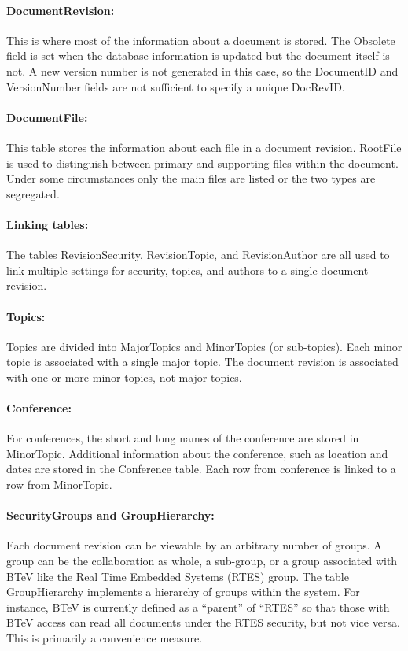 \documentclass[12pt]{article}
\begin{document}
\paragraph{DocumentRevision:} This is where most of the information about a
document is stored. The Obsolete field is set when the database information is
updated but the document itself is not. A new version number is not generated in
this case, so the DocumentID and VersionNumber fields are not sufficient to
specify a unique DocRevID.

\paragraph{DocumentFile:} This table stores  the information about each file in a
document revision. RootFile is used to distinguish between primary and supporting
files within the document. Under some circumstances only the main files are listed
or the two types are segregated.

\paragraph{Linking tables:} The tables RevisionSecurity, RevisionTopic, and
RevisionAuthor are all used to link multiple settings for security, topics, and
authors to a single document revision.

\paragraph{Topics:} Topics are divided into MajorTopics and MinorTopics (or
sub-topics). Each minor topic is associated with a single major topic. The
document revision is associated with one or more minor topics, not major topics. 

\paragraph{Conference:} For conferences, the short and long names of the
conference are stored in MinorTopic. Additional information about the
conference, such as location and dates are stored in the Conference table. Each
row from conference is linked to a row from MinorTopic.

\paragraph{SecurityGroups and GroupHierarchy:} Each document revision can be
viewable by an arbitrary number of groups. A group can be the collaboration as
whole, a sub-group, or a group associated with BTeV like the Real Time Embedded
Systems (RTES) group. The table GroupHierarchy implements a hierarchy of groups
within the system. For instance, BTeV is currently defined as a ``parent'' of
``RTES'' so that those with BTeV access can read all documents under the RTES
security, but not vice versa. This is primarily a convenience measure.
\end{document}
